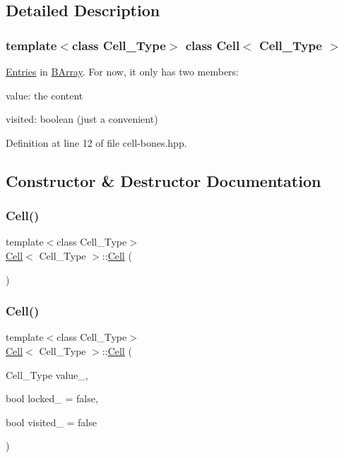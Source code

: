 \subsection{Detailed Description}
\subsubsection*{template$<$class Cell\+\_\+\+Type$>$\newline
class Cell$<$ Cell\+\_\+\+Type $>$}

\hyperlink{class_entries}{Entries} in \hyperlink{class_b_array}{B\+Array}. For now, it only has two members\+: 


\begin{DoxyItemize}
\item value\+: the content
\item visited\+: boolean (just a convenient) 
\end{DoxyItemize}

Definition at line 12 of file cell-\/bones.\+hpp.



\subsection{Constructor \& Destructor Documentation}
\mbox{\label{class_cell_a402912c21a4c87659c0576a4bfa3c48f}} 
\subsubsection{\texorpdfstring{Cell()}{Cell()}\hspace{0.1cm}{\footnotesize\ttfamily [1/9]}}
{\footnotesize\ttfamily template$<$class Cell\+\_\+\+Type$>$ \\
\hyperlink{class_cell}{Cell}$<$ Cell\+\_\+\+Type $>$\+::\hyperlink{class_cell}{Cell} (\begin{DoxyParamCaption}{ }\end{DoxyParamCaption})}

\mbox{\label{class_cell_aa29177047f3c4a062e3c1854efa92353}} 
\subsubsection{\texorpdfstring{Cell()}{Cell()}\hspace{0.1cm}{\footnotesize\ttfamily [2/9]}}
{\footnotesize\ttfamily template$<$class Cell\+\_\+\+Type$>$ \\
\hyperlink{class_cell}{Cell}$<$ Cell\+\_\+\+Type $>$\+::\hyperlink{class_cell}{Cell} (\begin{DoxyParamCaption}\item[{Cell\+\_\+\+Type}]{value\+\_\+,  }\item[{bool}]{locked\+\_\+ = {\ttfamily false},  }\item[{bool}]{visited\+\_\+ = {\ttfamily false} }\end{DoxyParamCaption})\hspace{0.3cm}{\ttfamily [inline]}}



